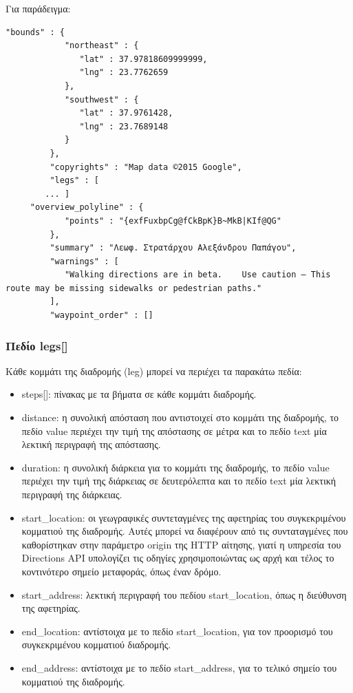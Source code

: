 Για παράδειγμα:

\begin{lstlisting}[basicstyle=\footnotesize\ttfamily, breaklines=true]
	"bounds" : {
            "northeast" : {
               "lat" : 37.97818609999999,
               "lng" : 23.7762659
            },
            "southwest" : {
               "lat" : 37.9761428,
               "lng" : 23.7689148
            }
         },
         "copyrights" : "Map data ©2015 Google",
         "legs" : [
	    ... ]
	 "overview_polyline" : {
            "points" : "{exfFuxbpCg@fCkBpK}B~MkB|KIf@QG"
         },
         "summary" : "Λεωφ. Στρατάρχου Αλεξάνδρου Παπάγου",
         "warnings" : [
            "Walking directions are in beta.    Use caution – This route may be missing sidewalks or pedestrian paths."
         ],
         "waypoint_order" : []   
\end{lstlisting}


\subsubsection{Πεδίο legs[]}

Κάθε κομμάτι της διαδρομής (leg) μπορεί να περιέχει τα παρακάτω πεδία:

\begin{itemize}
 \item steps[]: πίνακας με τα βήματα σε κάθε κομμάτι διαδρομής.
 \item distance: η συνολική απόσταση που αντιστοιχεί στο κομμάτι της διαδρομής, το πεδίο value περιέχει την τιμή της απόστασης σε μέτρα και το πεδίο text μία λεκτική περιγραφή της 
 απόστασης.
 \item duration: η συνολική διάρκεια για το κομμάτι της διαδρομής, το πεδίο value περιέχει την τιμή της διάρκειας σε δευτερόλεπτα και το πεδίο text μία 
 λεκτική περιγραφή της διάρκειας. 
 \item start\_location: οι γεωγραφικές συντεταγμένες της αφετηρίας του συγκεκριμένου κομματιού της διαδρομής. Αυτές μπορεί να διαφέρουν από τις συνταταγμένες που 
 καθορίστηκαν στην παράμετρο origin της HTTP αίτησης, γιατί η υπηρεσία του Directions API υπολογίζει τις οδηγίες χρησιμοποιώντας ως αρχή και τέλος το κοντινότερο σημείο 
 μεταφοράς, όπως έναν δρόμο.
 \item start\_address: λεκτική περιγραφή του πεδίου start\_location, όπως η διεύθυνση της αφετηρίας.
 \item end\_location: αντίστοιχα με το πεδίο start\_location, για τον προορισμό του συγκεκριμένου κομματιού διαδρομής.
 \item end\_address: αντίστοιχα με το πεδίο start\_address, για το τελικό σημείο του κομματιού της διαδρομής.
\end{itemize}

